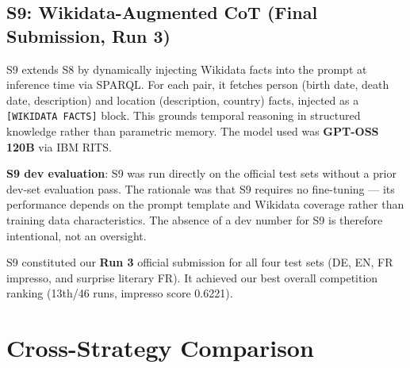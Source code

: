 \documentclass{ceurart}
\begin{document}
\subsection{S9: Wikidata-Augmented CoT (Final Submission, Run 3)}

S9 extends S8 by dynamically injecting Wikidata facts into the prompt at inference time via SPARQL. For each pair, it fetches person (birth date, death date, description) and location (description, country) facts, injected as a \texttt{[WIKIDATA FACTS]} block. This grounds temporal reasoning in structured knowledge rather than parametric memory. The model used was \textbf{GPT-OSS 120B} via IBM RITS.

\textbf{S9 dev evaluation}: S9 was run directly on the official test sets without a prior dev-set evaluation pass. The rationale was that S9 requires no fine-tuning --- its performance depends on the prompt template and Wikidata coverage rather than training data characteristics. The absence of a dev number for S9 is therefore intentional, not an oversight.

S9 constituted our \textbf{Run 3} official submission for all four test sets (DE, EN, FR impresso, and surprise literary FR). It achieved our best overall competition ranking (13th/46 runs, impresso score 0.6221).

\section{Cross-Strategy Comparison}
\label{sec:comparison}
\end{document}

